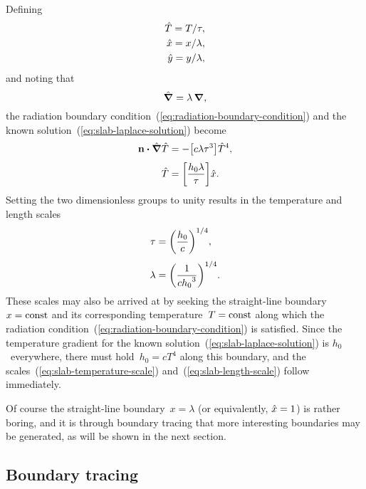Defining
\begin{align}
  \hat{T} = T / \tau, \label{eq:slab-scaled-temperature} \\
  \hat{x} = x / \lambda, \label{eq:slab-scaled-x} \\
  \hat{y} = y / \lambda, \label{eq:slab-scaled-y}
\end{align}
and noting that
\begin{equation}
  \mathop{}\!\hat{\mathop{}\!\boldsymbol{\mathrm{\nabla}}} = \lambda \mathop{}\!\boldsymbol{\mathrm{\nabla}},
  \label{eq:slab-scaled-del}
\end{equation}
the radiation boundary condition~(\ref{eq:radiation-boundary-condition})
and the known solution~(\ref{eq:slab-laplace-solution})
become
\begin{align}
  \normalvec \dotp \scaleddel \scaled{T}
    &= -\squarebr*{c \lambda \tau^3} \scaled{T}^4,
    \label{eq:slab-scaled-radiation-boundary-condition-with-groups}
    \\[\fraclinespace]
  \scaled{T}
    &= \squarebr*{\frac{h_0 \lambda}{\tau}} \scaled{x}.
    \label{eq:slab-scaled-laplace-solution-with-groups}
\end{align}
Setting the two dimensionless groups to unity
results in the temperature and length scales
\begin{align}
  \tau &= \roundbr*{\frac{h_0}{c}}^{1/4},
    \label{eq:slab-temperature-scale} \\[\fraclinespace]
  \lambda &= \roundbr*{\frac{1}{c {h_0}^3}}^{1/4}.
    \label{eq:slab-length-scale}
\end{align}
These scales may also be arrived at
by seeking the straight-line boundary~$x = \mathrm{const}$
and its corresponding temperature~$T = \mathrm{const}$
along which the radiation condition~(\ref{eq:radiation-boundary-condition})
is satisfied.
Since the temperature gradient
for the known solution~(\ref{eq:slab-laplace-solution})
is $h_0$~everywhere,
there must hold~$h_0 = c T^4$ along this boundary,
and the scales~(\ref{eq:slab-temperature-scale})
and~(\ref{eq:slab-length-scale}) follow immediately.

Of course the straight-line boundary~$x = \lambda$
(or equivalently, $\hat{x} = 1$)
is rather boring,
and it is through boundary tracing
that more interesting boundaries may be generated,
as will be shown in the next section.

\subsection{Boundary tracing}
\label{sec:cartesian.slab.tracing}

